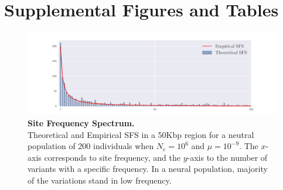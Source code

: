 \section{Supplemental Figures and Tables}

\begin{figure}[H]
	\centering
	\includegraphics[trim=.01in 0.1in .01in 
	0.1in,clip,width=\textwidth]{sfs.pdf}
	\caption{{\bf Site Frequency Spectrum.}\\ Theoretical and
          Empirical SFS in a 50Kbp region for a neutral population of 200
          individuals when $N_e=10^6$ and $\mu=10^{-9}$. The $x$-axis 
          corresponds to site frequency, and
          the $y$-axis to the number of variants with a specific
          frequency. 
          In a neural population, majority of the variations stand in low 
          frequency.} \label{fig:sfs}
\end{figure}


